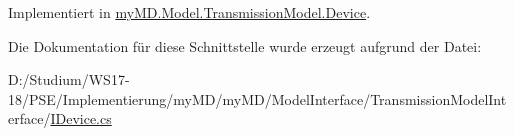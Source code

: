 Implementiert in \mbox{\hyperlink{classmy_m_d_1_1_model_1_1_transmission_model_1_1_device_af8485fc857a036d58e8b1ba38e7d098a}{my\+M\+D.\+Model.\+Transmission\+Model.\+Device}}.



Die Dokumentation für diese Schnittstelle wurde erzeugt aufgrund der Datei\+:\begin{DoxyCompactItemize}
\item 
D\+:/\+Studium/\+W\+S17-\/18/\+P\+S\+E/\+Implementierung/my\+M\+D/my\+M\+D/\+Model\+Interface/\+Transmission\+Model\+Interface/\mbox{\hyperlink{_i_device_8cs}{I\+Device.\+cs}}\end{DoxyCompactItemize}
